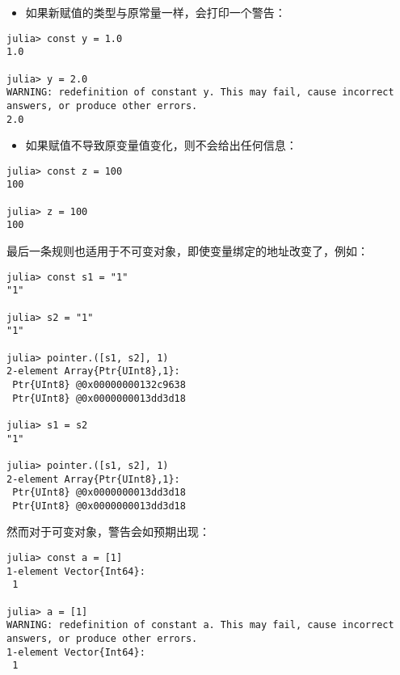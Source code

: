 \begin{itemize}
\item 如果新赋值的类型与原常量一样，会打印一个警告：

\end{itemize}



\begin{verbatim}
julia> const y = 1.0
1.0

julia> y = 2.0
WARNING: redefinition of constant y. This may fail, cause incorrect answers, or produce other errors.
2.0
\end{verbatim}



\begin{itemize}
\item 如果赋值不导致原变量值变化，则不会给出任何信息：

\end{itemize}



\begin{verbatim}
julia> const z = 100
100

julia> z = 100
100
\end{verbatim}



最后一条规则也适用于不可变对象，即使变量绑定的地址改变了，例如：




\begin{verbatim}
julia> const s1 = "1"
"1"

julia> s2 = "1"
"1"

julia> pointer.([s1, s2], 1)
2-element Array{Ptr{UInt8},1}:
 Ptr{UInt8} @0x00000000132c9638
 Ptr{UInt8} @0x0000000013dd3d18

julia> s1 = s2
"1"

julia> pointer.([s1, s2], 1)
2-element Array{Ptr{UInt8},1}:
 Ptr{UInt8} @0x0000000013dd3d18
 Ptr{UInt8} @0x0000000013dd3d18
\end{verbatim}



然而对于可变对象，警告会如预期出现：




\begin{verbatim}
julia> const a = [1]
1-element Vector{Int64}:
 1

julia> a = [1]
WARNING: redefinition of constant a. This may fail, cause incorrect answers, or produce other errors.
1-element Vector{Int64}:
 1
\end{verbatim}



